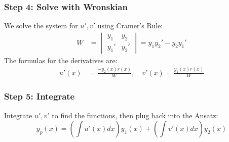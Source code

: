 \documentclass[11pt]{article}
\begin{document}
\subsubsection*{Step 4: Solve with Wronskian}
We solve the system for $u', v'$ using Cramer's Rule:
\begin{align*}
    W &= \begin{vmatrix} y_1 & y_2 \\ y_1' & y_2' \end{vmatrix} = y_1 y_2' - y_2 y_1'
\end{align*}
The formulas for the derivatives are:
\begin{align*}
    u'(x) &= \frac{-y_2(x) r(x)}{W}, \quad v'(x) = \frac{y_1(x) r(x)}{W}
\end{align*}

\subsubsection*{Step 5: Integrate}
Integrate $u', v'$ to find the functions, then plug back into the Ansatz:
\[ y_p(x) = \left( \int u'(x) dx \right)y_1(x) + \left( \int v'(x) dx \right)y_2(x) \]
\end{document}
